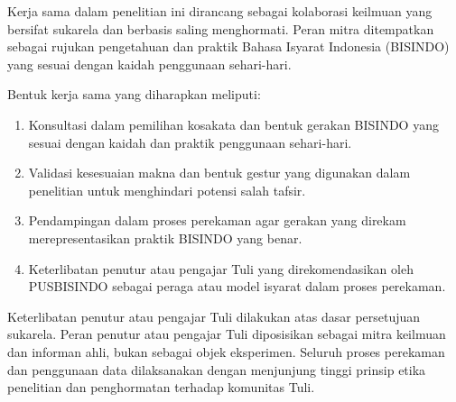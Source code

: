 Kerja sama dalam penelitian ini dirancang sebagai kolaborasi keilmuan yang bersifat sukarela dan berbasis saling menghormati.  
Peran mitra ditempatkan sebagai rujukan pengetahuan dan praktik Bahasa Isyarat Indonesia (BISINDO) yang sesuai dengan kaidah penggunaan sehari-hari.  

Bentuk kerja sama yang diharapkan meliputi:  
\begin{enumerate}[noitemsep]
    \item Konsultasi dalam pemilihan kosakata dan bentuk gerakan BISINDO yang sesuai dengan kaidah dan praktik penggunaan sehari-hari.  
    \item Validasi kesesuaian makna dan bentuk gestur yang digunakan dalam penelitian untuk menghindari potensi salah tafsir.  
    \item Pendampingan dalam proses perekaman agar gerakan yang direkam merepresentasikan praktik BISINDO yang benar.  
    \item Keterlibatan penutur atau pengajar Tuli yang direkomendasikan oleh PUSBISINDO sebagai peraga atau model isyarat dalam proses perekaman.  
\end{enumerate}

Keterlibatan penutur atau pengajar Tuli dilakukan atas dasar persetujuan sukarela.  
Peran penutur atau pengajar Tuli diposisikan sebagai mitra keilmuan dan informan ahli, bukan sebagai objek eksperimen.  
Seluruh proses perekaman dan penggunaan data dilaksanakan dengan menjunjung tinggi prinsip etika penelitian dan penghormatan terhadap komunitas Tuli.  